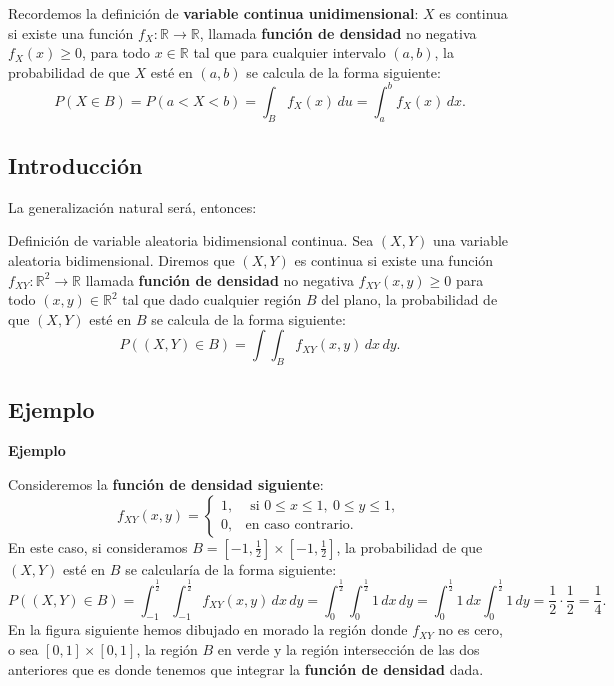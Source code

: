 \documentclass[]{book}
\begin{document}
Recordemos la definición de \textbf{variable continua unidimensional}: \(X\) es continua si existe una función \(f_X:\mathbb{R}\longrightarrow \mathbb{R}\), llamada \textbf{función de densidad} no negativa \(f_X(x)\geq 0\), para todo \(x\in\mathbb{R}\) tal que para cualquier intervalo \((a,b)\), la probabilidad de que \(X\) esté en \((a,b)\) se calcula de la forma siguiente:
\[
P(X\in B)=P(a< X < b)=\int_B f_{X}(x)\,du=\int_a^b f_{X}(x)\,dx.
\]

\hypertarget{introducciuxf3n-6}{%
\subsection{Introducción}\label{introducciuxf3n-6}}

La generalización natural será, entonces:

Definición de variable aleatoria bidimensional continua.
Sea \((X,Y)\) una variable aleatoria bidimensional. Diremos que \((X,Y)\) es continua si existe una función
\(f_{XY}:\mathbb{R}^2\longrightarrow \mathbb{R}\) llamada \textbf{función de densidad} no negativa \(f_{XY}(x,y)\geq 0\) para todo \((x,y)\in\mathbb{R}^2\) tal que dado cualquier región \(B\) del plano, la probabilidad de que \((X,Y)\) esté en \(B\) se calcula de la forma siguiente:
\[
P((X,Y)\in B)=\int\int_B f_{XY}(x,y)\,dx\,dy.
\]

\hypertarget{ejemplo-40}{%
\subsection{Ejemplo}\label{ejemplo-40}}

\textbf{Ejemplo}

Consideremos la \textbf{función de densidad siguiente}:
\[
f_{XY}(x,y)=\begin{cases}
1, & \mbox{ si }0\leq x\leq 1,\ 0\leq y\leq 1, \\
0, & \mbox{en caso contrario.}
\end{cases}
\]
En este caso, si consideramos \(B=\left[-1,\frac{1}{2}\right]\times \left[-1,\frac{1}{2}\right]\), la probabilidad de que \((X,Y)\) esté en \(B\) se calcularía de la forma siguiente:
\[
P((X,Y)\in B)=\int_{-1}^{\frac{1}{2}}\int_{-1}^{\frac{1}{2}} f_{XY}(x,y)\, dx\, dy =\int_0^{\frac{1}{2}}\int_0^{\frac{1}{2}} 1\, dx\,dy=\int_0^{\frac{1}{2}} 1\, dx\int_0^{\frac{1}{2}} 1\, dy=\frac{1}{2}\cdot\frac{1}{2}=\frac{1}{4}.
\]
En la figura siguiente hemos dibujado en morado la región donde \(f_{XY}\) no es cero, o sea \([0,1]\times [0,1]\), la región \(B\) en verde y la región intersección de las dos anteriores que es donde tenemos que integrar la \textbf{función de densidad} dada.
\end{document}
